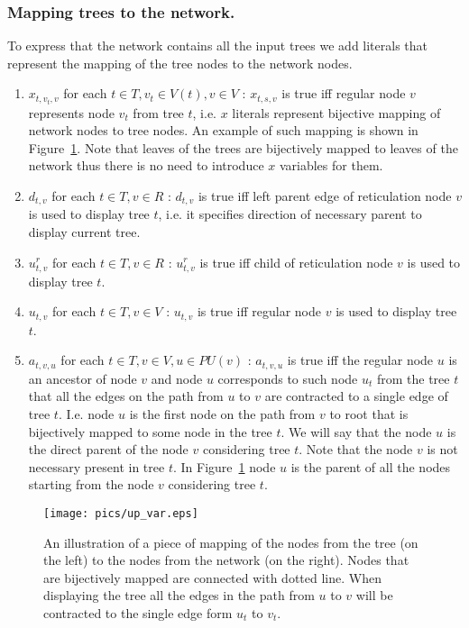 \documentclass[runningheads, envcountsame, a4paper]{llncs}
\begin{document}
\subsubsection{Mapping trees to the network.}

To express that the network contains all the input trees we add literals that represent the mapping of the tree nodes to 
the network nodes.

\begin{enumerate}

\item $x_{t,v_t,v}$ for each $t \in T, v_t \in V(t), v \in V$ :
$x_{t,s,v}$ is true iff regular node $v$ represents node $v_t$ from tree $t$, i.e. $x$ literals represent bijective 
mapping of network nodes to tree nodes. An example of such mapping is shown in Figure~\ref{mapping-example}.
Note that leaves of the trees are bijectively mapped to leaves of the network thus there is no need to introduce $x$ variables for them.

\item $d_{t,v}$ for each $t \in T, v \in R$ :
$d_{t,v}$ is true iff left parent edge of reticulation node $v$ is used to display tree $t$,
 i.e. it specifies direction of necessary parent to display current tree.

\item $u^r_{t,v}$ for each $t \in T, v \in R$ :
$u^r_{t,v}$ is true iff child of reticulation node $v$ is used to display tree $t$.

\item $u_{t,v}$ for each $t \in T, v \in V$ :
$u_{t,v}$ is true iff regular node $v$ is used to display tree $t$.

\item $a_{t,v,u}$ for each $t \in T, v \in V, u \in PU(v)$ :
$a_{t,v,u}$ is true iff the regular node $u$ is an ancestor of node $v$ and node $u$ corresponds to such node $u_t$ 
from the tree $t$ that all the edges on the path from $u$ to $v$ are contracted to a single edge of tree $t$. I.e. node
$u$ is the first node on the path from $v$ to root that is bijectively mapped to some node in the tree $t$.
We will say that the node $u$ is the direct parent of the node $v$ considering tree $t$. Note that the node $v$ is not necessary present in tree $t$.
In Figure~\ref{mapping-example} node $u$ is the parent of all the nodes starting from the node $v$ considering tree $t$.

\end{enumerate}

\begin{figure}[t]
  \centering
  \texttt{[image: pics/up\_var.eps]}
  \caption{An illustration of a piece of mapping of the nodes from the tree (on the left) to the nodes from the network (on the right). 
  Nodes that are bijectively mapped are connected with dotted line. When displaying the tree all the edges in the path from $u$ to $v$
  will be contracted to the single edge form $u_t$ to $v_t$.}
  \label{mapping-example}
\end{figure}
\end{document}
